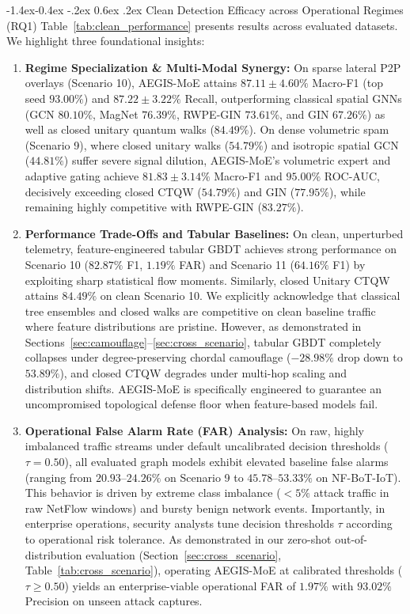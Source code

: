 \documentclass[10pt,twocolumn,letterpaper]{article}
\makeatletter
\renewcommand\subsection{\@startsection{subsection}{2}{\z@}%
                                     {-1.4ex\@plus -0.4ex \@minus -.2ex}%
                                     {0.6ex \@plus .2ex}%
                                     {\normalfont\normalsize\bfseries}}
\makeatother
\begin{document}
\subsection{Clean Detection Efficacy across Operational Regimes (RQ1)}
Table~\ref{tab:clean_performance} presents results across evaluated datasets. We highlight three foundational insights:
\begin{enumerate}
    \item \textbf{Regime Specialization \& Multi-Modal Synergy:} On sparse lateral P2P overlays (Scenario 10), AEGIS-MoE attains $\mathbf{87.11 \pm 4.60\%}$ Macro-F1 (top seed $93.00\%$) and $\mathbf{87.22 \pm 3.22\%}$ Recall, outperforming classical spatial GNNs (GCN $80.10\%$, MagNet $76.39\%$, RWPE-GIN $73.61\%$, and GIN $67.26\%$) as well as closed unitary quantum walks ($84.49\%$). On dense volumetric spam (Scenario 9), where closed unitary walks ($54.79\%$) and isotropic spatial GCN ($44.81\%$) suffer severe signal dilution, AEGIS-MoE's volumetric expert and adaptive gating achieve $81.83 \pm 3.14\%$ Macro-F1 and $\mathbf{95.00\%}$ ROC-AUC, decisively exceeding closed CTQW ($54.79\%$) and GIN ($77.95\%$), while remaining highly competitive with RWPE-GIN ($83.27\%$).
    \item \textbf{Performance Trade-Offs and Tabular Baselines:} On clean, unperturbed telemetry, feature-engineered tabular GBDT achieves strong performance on Scenario 10 ($82.87\%$ F1, $1.19\%$ FAR) and Scenario 11 ($64.16\%$ F1) by exploiting sharp statistical flow moments. Similarly, closed Unitary CTQW attains $84.49\%$ on clean Scenario 10. We explicitly acknowledge that classical tree ensembles and closed walks are competitive on clean baseline traffic where feature distributions are pristine. However, as demonstrated in Sections~\ref{sec:camouflage}--\ref{sec:cross_scenario}, tabular GBDT completely collapses under degree-preserving chordal camouflage ($-28.98\%$ drop down to $53.89\%$), and closed CTQW degrades under multi-hop scaling and distribution shifts. AEGIS-MoE is specifically engineered to guarantee an uncompromised topological defense floor when feature-based models fail.
    \item \textbf{Operational False Alarm Rate (FAR) Analysis:} On raw, highly imbalanced traffic streams under default uncalibrated decision thresholds ($\tau = 0.50$), all evaluated graph models exhibit elevated baseline false alarms (ranging from $20.93\text{--}24.26\%$ on Scenario 9 to $45.78\text{--}53.33\%$ on NF-BoT-IoT). This behavior is driven by extreme class imbalance ($<5\%$ attack traffic in raw NetFlow windows) and bursty benign network events. Importantly, in enterprise operations, security analysts tune decision thresholds $\tau$ according to operational risk tolerance. As demonstrated in our zero-shot out-of-distribution evaluation (Section~\ref{sec:cross_scenario}, Table~\ref{tab:cross_scenario}), operating AEGIS-MoE at calibrated thresholds ($\tau \ge 0.50$) yields an enterprise-viable operational FAR of $\mathbf{1.97\%}$ with $\mathbf{93.02\%}$ Precision on unseen attack captures.
\end{enumerate}
\end{document}
